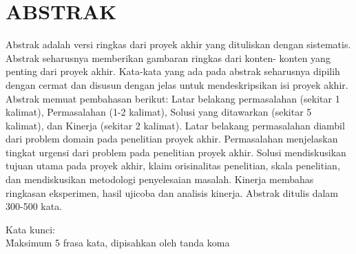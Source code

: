 %
%

\chapter*{ABSTRAK}

\par
Abstrak adalah versi ringkas dari proyek akhir yang dituliskan dengan sistematis. Abstrak seharusnya memberikan gambaran ringkas dari konten- konten yang penting dari proyek akhir. Kata-kata yang ada pada abstrak seharusnya dipilih dengan cermat dan disusun dengan jelas untuk mendeskripsikan isi proyek akhir. Abstrak memuat pembahasan berikut: Latar belakang permasalahan (sekitar 1 kalimat), Permasalahan (1-2 kalimat), Solusi yang ditawarkan (sekitar 5 kalimat), dan Kinerja (sekitar 2 kalimat). Latar belakang permasalahan diambil dari problem domain pada penelitian proyek akhir. Permasalahan menjelaskan tingkat urgensi dari problem pada penelitian proyek akhir. Solusi mendiskusikan tujuan utama pada proyek akhir, klaim orisinalitas penelitian, skala penelitian, dan mendiskusikan metodologi penyelesaian masalah. Kinerja membahas ringkasan eksperimen, hasil ujicoba dan analisis kinerja. Abstrak ditulis dalam 300-500 kata.
\\

\vspace*{0.2cm}

\noindent Kata kunci: \\ \f{Maksimum 5 frasa kata, dipisahkan oleh tanda koma}  \\

\newpage
